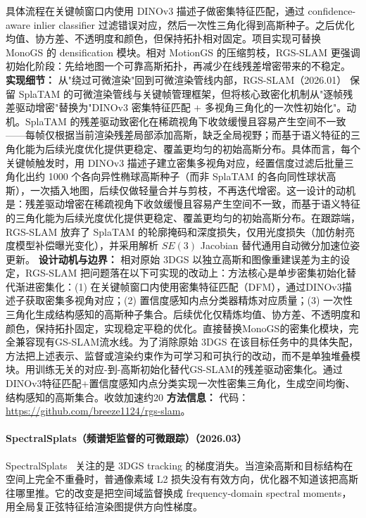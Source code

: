 具体流程在关键帧窗口内使用 DINOv3 描述子做密集特征匹配，通过 confidence-aware inlier classifier 过滤错误对应，然后一次性三角化得到高斯种子。之后优化均值、协方差、不透明度和颜色，但保持拓扑相对固定。项目实现可替换 MonoGS 的 densification 模块。相对 MotionGS 的压缩剪枝，RGS-SLAM 更强调初始化阶段：先给地图一个可靠高斯拓扑，再减少在线残差增密带来的不稳定。
\textbf{实现细节：} 从"绕过可微渲染"回到可微渲染管线内部，RGS-SLAM（2026.01） 保留 SplaTAM 的可微渲染管线与关键帧管理框架，但将核心致密化机制从"逐帧残差驱动增密"替换为"DINOv3 密集特征匹配 $+$ 多视角三角化的一次性初始化"。动机。SplaTAM 的残差驱动致密化在稀疏视角下收敛缓慢且容易产生空间不一致——每帧仅根据当前渲染残差局部添加高斯，缺乏全局视野；而基于语义特征的三角化能为后续光度优化提供更稳定、覆盖更均匀的初始高斯分布。具体而言，每个关键帧触发时，用 DINOv3 描述子建立密集多视角对应，经置信度过滤后批量三角化出约 1000 个各向异性椭球高斯种子（而非 SplaTAM 的各向同性球状高斯），一次插入地图，后续仅做轻量合并与剪枝，不再迭代增密。这一设计的动机是：残差驱动增密在稀疏视角下收敛缓慢且容易产生空间不一致，而基于语义特征的三角化能为后续光度优化提供更稳定、覆盖更均匀的初始高斯分布。在跟踪端，RGS-SLAM 放弃了 SplaTAM 的轮廓掩码和深度损失，仅用光度损失（加仿射亮度模型补偿曝光变化），并采用解析 $SE(3)$ Jacobian 替代通用自动微分加速位姿更新。
\textbf{设计动机与边界：} 相对原始 3DGS 以独立高斯和图像重建误差为主的设定，RGS-SLAM 把问题落在以下可实现的改动上：方法核心是单步密集初始化替代渐进密集化：(1) 在关键帧窗口内使用密集特征匹配（DFM），通过DINOv3描述子获取密集多视角对应；(2) 置信度感知内点分类器精炼对应质量；(3) 一次性三角化生成结构感知的高斯种子集合。后续优化仅精炼均值、协方差、不透明度和颜色，保持拓扑固定，实现稳定平稳的优化。直接替换MonoGS的密集化模块，完全兼容现有GS-SLAM流水线。为了消除原始 3DGS 在该目标任务中的具体失配，方法把上述表示、监督或渲染约束作为可学习和可执行的改动，而不是单独堆叠模块。用训练无关的对应-到-高斯初始化替代GS-SLAM的残差驱动密集化。通过DINOv3特征匹配+置信度感知内点分类实现一次性密集三角化，生成空间均衡、结构感知的高斯集合。收敛加速约20%
\textbf{方法信息：} 代码：\url{https://github.com/breeze1124/rgs-slam}。



\paragraph{SpectralSplats（频谱矩监督的可微跟踪）（2026.03）}
SpectralSplats~\cite{2603_24036} 关注的是 3DGS tracking 的梯度消失。当渲染高斯和目标结构在空间上完全不重叠时，普通像素域 L2 损失没有有效方向，优化器不知道该把高斯往哪里推。它的改变是把空间域监督换成 frequency-domain spectral moments，用全局复正弦特征给渲染图提供方向性梯度。

